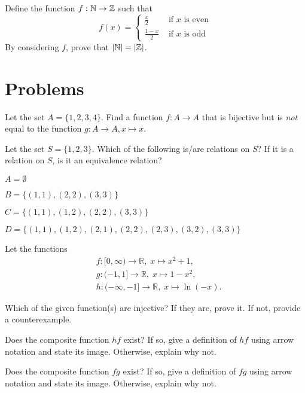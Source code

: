 \begin{exercise}
    Define the function $f: \mathbb{N} \to \mathbb{Z}$ such that
    \[
        f(x) = \begin{cases}
            \frac{x}{2} & \text{ if } x \text{ is even}\\
            \frac{1-x}{2} & \text{ if } x \text{ is odd}
        \end{cases}
    \]
    By considering $f$, prove that $|\mathbb{N}| = |\mathbb{Z}|$.
\end{exercise}

\newpage

\section{Problems}
\begin{problem}
    Let the set $A = \{1, 2, 3, 4\}$. Find a function $f: A \to A$ that is bijective but is \textit{not} equal to the function $g: A \to A, x \mapsto x$.
\end{problem}

\begin{problem}
    Let the set $S = \{1, 2, 3\}$. Which of the following is/are relations on $S$? If it is a relation on $S$, is it an equivalence relation?
    \begin{partquestions}{\alph*}
        \item $A = \emptyset$
        \item $B = \{(1, 1), (2, 2), (3, 3)\}$
        \item $C = \{(1, 1), (1, 2), (2, 2), (3, 3)\}$
        \item $D = \{(1, 1), (1, 2), (2, 1), (2, 2), (2, 3), (3, 2), (3, 3)\}$
    \end{partquestions}
\end{problem}

\begin{problem}
    Let the functions
    \begin{align*}
        &f: [0, \infty) \to \mathbb{R},\; x\mapsto x^2+1,\\
        &g: (-1, 1] \to \mathbb{R},\; x\mapsto 1-x^2,\\
        &h: (-\infty, -1] \to \mathbb{R},\; x\mapsto \ln(-x).
    \end{align*}
    \begin{partquestions}{\alph*}
        \item Which of the given function(s) are injective? If they are, prove it. If not, provide a counterexample.
        \item Does the composite function $hf$ exist? If so, give a definition of $hf$ using arrow notation and state its image. Otherwise, explain why not.
        \item Does the composite function $fg$ exist? If so, give a definition of $fg$ using arrow notation and state its image. Otherwise, explain why not.
    \end{partquestions}
\end{problem}


